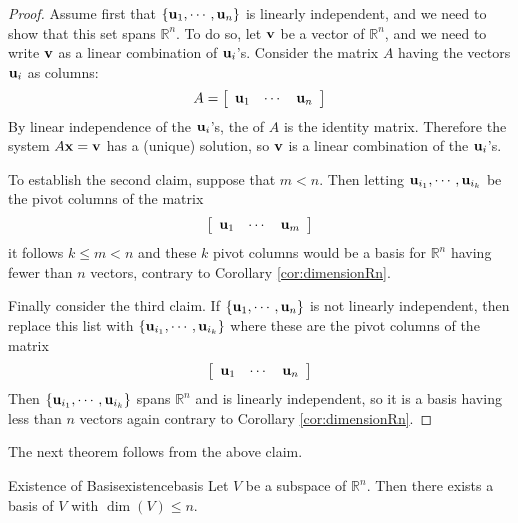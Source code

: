 \begin{proof}
Assume first that $\left\{ {\bf u}_{1},\cdots ,{\bf u}_{n}\right\} $
is linearly independent, and we need to show that this set spans
$\mathbb{R}^{n}$. To do so, let ${\bf v}$ be a vector of
$\mathbb{R}^{n}$, and we need to write ${\bf v}$ as a linear combination of ${\bf u}_i$'s. 
Consider the matrix $A$ having the vectors ${\bf u}_i$  as
columns:
\begin{equation*}
A = 
\left[
\begin{array}{rrr}
{\bf u}_{1} & \cdots & {\bf u}_{n} 
\end{array}
\right]
\end{equation*}
By linear independence of the ${\bf u}_i$'s, the {\rref} of $A$ is
the identity matrix.  Therefore the system $A{\bf x}=
{\bf v}$ has a (unique) solution, so ${\bf v}$ is a linear combination
of the ${\bf u}_i$'s.

To establish the second claim, suppose that $m<n.$ Then letting
${\bf u}_{i_{1}},\cdots ,{\bf u}_{i_{k}}$ be the pivot columns of the
matrix
\begin{equation*}
\left[
\begin{array}{ccc}
{\bf u}_{1} & \cdots & {\bf u}_{m}
\end{array}
\right]
\end{equation*}
it follows $k\leq m<n$ and these $k$ pivot columns would be a basis
for $\mathbb{R}^{n}$ having fewer than $n$ vectors, contrary to
Corollary \ref{cor:dimensionRn}.

Finally consider the third claim. If $\left\{ {\bf u}_{1},\cdots
,{\bf u}_{n}\right\} $ is not linearly independent, then replace this
list with $\left\{ {\bf u}_{i_{1}},\cdots ,{\bf u}_{i_{k}}\right\} $ where these
are the pivot columns of the matrix 
\begin{equation*}
\left[
\begin{array}{ccc}
{\bf u}_{1} & \cdots & {\bf u}_{n}
\end{array}
\right]
\end{equation*}
Then $\left\{ {\bf u}_{i_{1}},\cdots ,{\bf u}_{i_{k}}\right\} $ spans
$\mathbb{R}^{n}$ and is linearly independent, so it is a basis having
less than $n$ vectors again contrary to Corollary \ref{cor:dimensionRn}.
\end{proof}

The next theorem follows from the above claim.

\begin{theorem}{Existence of Basis}{existencebasis}
Let $V$ be a subspace of $\mathbb{R}^n$. Then there exists a basis of $V$ with 
 $\dim(V)\leq n$.
\end{theorem}

